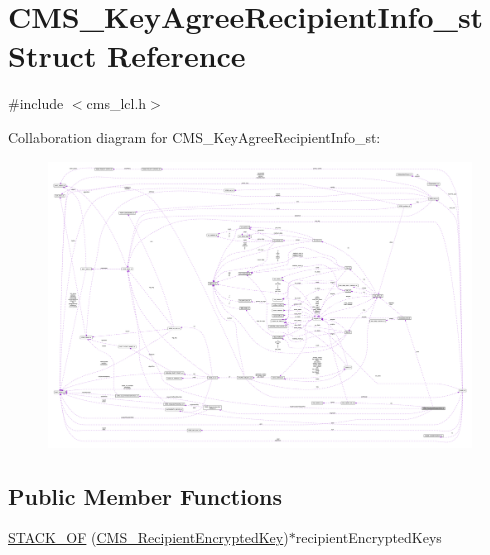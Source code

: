 \hypertarget{struct_c_m_s___key_agree_recipient_info__st}{}\section{C\+M\+S\+\_\+\+Key\+Agree\+Recipient\+Info\+\_\+st Struct Reference}
\label{struct_c_m_s___key_agree_recipient_info__st}


{\ttfamily \#include $<$cms\+\_\+lcl.\+h$>$}



Collaboration diagram for C\+M\+S\+\_\+\+Key\+Agree\+Recipient\+Info\+\_\+st\+:\nopagebreak
\begin{figure}[H]
\begin{center}
\leavevmode
\includegraphics[width=350pt]{struct_c_m_s___key_agree_recipient_info__st__coll__graph}
\end{center}
\end{figure}
\subsection*{Public Member Functions}
\begin{DoxyCompactItemize}
\item 
\hyperlink{struct_c_m_s___key_agree_recipient_info__st_adcca92607414eda94d2234138cf61b16}{S\+T\+A\+C\+K\+\_\+\+OF} (\hyperlink{crypto_2cms_2cms_8h_aea929bebf778a99c3f2c6b5151850fc8}{C\+M\+S\+\_\+\+Recipient\+Encrypted\+Key})$\ast$recipient\+Encrypted\+Keys
\end{DoxyCompactItemize}
